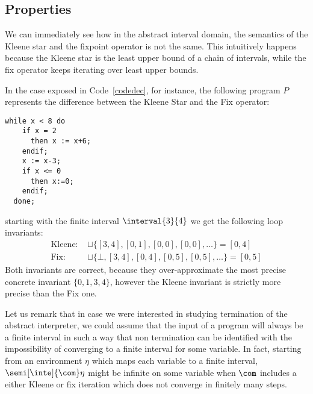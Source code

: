 \subsection{Properties}
\label{sub:intervalsprop}

We can immediately see how in the abstract interval domain, the
semantics of the Kleene star and the fixpoint operator is not the
same. This intuitively happens because the Kleene star is the least
upper bound of a chain of intervals, while the fix operator keeps
iterating over least upper bounds.

\begin{example} \label{ex:fix} In the case exposed in
  Code~\ref{codedec}, for instance, the following program \(P\)
  represents the difference between the Kleene Star and the Fix
  operator:
  \begin{lstlisting}[caption=\(\fix{\com}\) and \(\com^*\) difference, label=codedec, language=Imp]
  while x < 8 do
    if x = 2
      then x := x+6;
    endif;
    x := x-3;
    if x <= 0
      then x:=0;
    endif;
  done;\end{lstlisting}
  starting with the finite interval \(\interval{3}{4}\) we get the
  following loop invariants:
  \begin{align*}
    \text{Kleene: } &\sqcup\{[3,4], [0,1], [0,0], [0,0], \ldots\} = [0,4]\\
    \text{Fix: } & \sqcup\{\bot, [3,4], [0,4], [0,5], [0,5],\ldots\} = [0,5]
  \end{align*}
  \noindent
  Both invariants are correct, because they over-approximate the most
  precise concrete invariant \(\{0,1,3,4\}\), however the Kleene
  invariant is strictly more precise than the Fix one.
\end{example}


\begin{remark}
  Let us remark that in case we were interested in studying
  termination of the abstract interpreter, we could assume that the
  input of a program will always be a finite interval in such a way
  that non termination can be identified with the impossibility of
  converging to a finite interval for some variable. In fact, starting
  from an environment \(\eta\) which maps each variable to a finite
  interval, \(\semi[\inte]{\com}\eta\) might be infinite on some variable
  when \(\com\) includes a either Kleene or fix iteration which does
  not converge in finitely many steps.
\end{remark}
